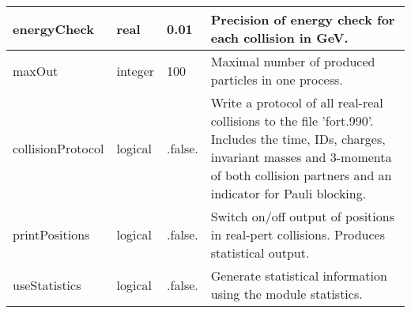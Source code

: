 \documentclass{article}
\begin{document}
\begin{longtable}{llll}
\midrule
energyCheck & \begin{minipage}[t]{2cm}real\end{minipage} & \begin{minipage}[t]{2cm}0.01\end{minipage} & \begin{minipage}[t]{12cm}Precision of energy check for each collision in GeV.\end{minipage}\\*
\midrule
maxOut & \begin{minipage}[t]{2cm}integer\end{minipage} & \begin{minipage}[t]{2cm}100\end{minipage} & \begin{minipage}[t]{12cm}Maximal number of produced particles in one process.\end{minipage}\\*
\midrule
collisionProtocol & \begin{minipage}[t]{2cm}logical\end{minipage} & \begin{minipage}[t]{2cm}.false.\end{minipage} & \begin{minipage}[t]{12cm}Write a protocol of all real-real collisions to the file 'fort.990'. Includes the time, IDs, charges, invariant masses and 3-momenta of both collision partners and an indicator for Pauli blocking.\end{minipage}\\*
\midrule
printPositions & \begin{minipage}[t]{2cm}logical\end{minipage} & \begin{minipage}[t]{2cm}.false.\end{minipage} & \begin{minipage}[t]{12cm}Switch on/off output of positions in real-pert collisions. Produces statistical output.\end{minipage}\\*
\midrule
useStatistics & \begin{minipage}[t]{2cm}logical\end{minipage} & \begin{minipage}[t]{2cm}.false.\end{minipage} & \begin{minipage}[t]{12cm}Generate statistical information using the module statistics.\end{minipage}\\*

\end{longtable}
\end{document}
